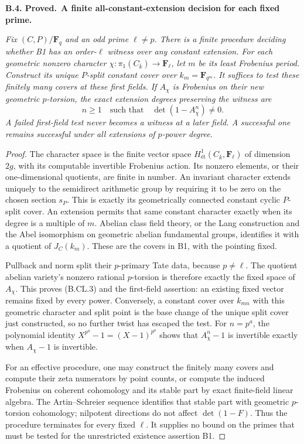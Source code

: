 \documentclass[11pt,a4paper]{article}
\newcommand{\et}{\text{ét}}
\newenvironment{claim}[3]{\par\medskip\noindent\hypertarget{#1}{\textbf{#1. #2.}}\ \textbf{#3.}\par\nopagebreak\smallskip\begingroup\itshape}{\endgroup\par\smallskip}
\begin{document}
\begin{claim}{B.4}{Proved}{A finite all-constant-extension decision for each fixed prime}
Fix $(C,P)/\mathbf F_q$ and an odd prime $\ell\ne p$.
There is a finite procedure deciding whether B1 has an
order-$\ell$ witness over \emph{any} constant extension.
For each geometric nonzero character
$\chi:\pi_1(C_{\overline k})\to\mathbf F_\ell$, let $m$
be its least Frobenius period. Construct its unique $P$-split
constant cover over $k_m=\mathbf F_{q^m}$. It suffices to test
these finitely many covers at these first fields. If $A_\chi$
is Frobenius on their new geometric $p$-torsion, the exact
extension degrees preserving the witness are
\[
  n\ge1\quad\text{such that}\quad
                  \det(1-A_\chi^n)\ne0.                \tag{B.CL.3}
\]
A failed first-field test never becomes a witness at a later
field. A successful one remains successful under all
extensions of $p$-power degree.
\end{claim}
\begin{proof}
The character space is the finite vector space
$H^1_{\et}(C_{\overline k},\mathbf F_\ell)$ of dimension
$2g$, with its computable invertible Frobenius action.
Its nonzero elements, or their one-dimensional quotients,
are finite in number. An invariant character extends uniquely
to the semidirect arithmetic group by requiring it to be zero
on the chosen section $s_P$. This is exactly its geometrically
connected constant cyclic $P$-split cover. An extension permits
that same constant character exactly when its degree is a
multiple of $m$. Abelian class field theory, or the Lang
construction and the Abel isomorphism on geometric abelian
fundamental groups, identifies it with a quotient of
$J_C(k_m)$. These are the covers in B1, with the pointing fixed.

Pullback and norm split their $p$-primary Tate data, because
$p\ne\ell$. The quotient abelian variety's nonzero rational
$p$-torsion is therefore exactly the fixed space of $A_\chi$.
This proves (B.CL.3) and the first-field assertion: an existing
fixed vector remains fixed by every power. Conversely, a
constant cover over $k_{mn}$ with this geometric character and
split point is the base change of the unique split cover just
constructed, so no further twist has escaped the test.
For $n=p^a$, the polynomial identity
$X^{p^a}-1=(X-1)^{p^a}$ shows that $A_\chi^n-1$ is
invertible exactly when $A_\chi-1$ is invertible.

For an effective procedure, one may construct the finitely
many covers and compute their zeta numerators by point counts,
or compute the induced Frobenius on coherent cohomology and
its stable part by exact finite-field linear algebra. The
Artin--Schreier sequence identifies that stable part with
geometric \(p\)-torsion cohomology; nilpotent directions do
not affect $\det(1-F)$. Thus the procedure terminates for
every fixed $\ell$. It supplies no bound on the primes that
must be tested for the unrestricted existence assertion B1.
\end{proof}
\end{document}
